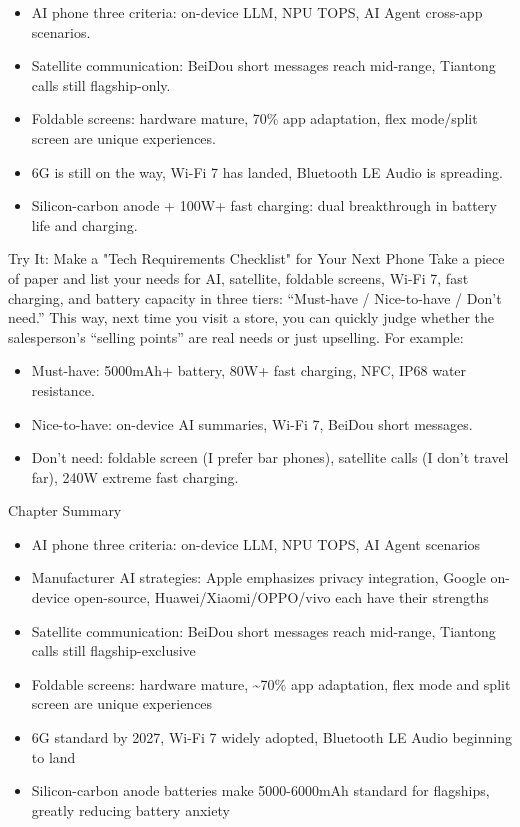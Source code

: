 
\begin{itemize}
  \item AI phone three criteria: on-device LLM, NPU TOPS, AI Agent cross-app scenarios.
  \item Satellite communication: BeiDou short messages reach mid-range, Tiantong calls still flagship-only.
  \item Foldable screens: hardware mature, 70\% app adaptation, flex mode/split screen are unique experiences.
  \item 6G is still on the way, Wi-Fi 7 has landed, Bluetooth LE Audio is spreading.
  \item Silicon-carbon anode + 100W+ fast charging: dual breakthrough in battery life and charging.
\end{itemize}

\begin{tcbpractice}{Try It: Make a "Tech Requirements Checklist" for Your Next Phone}
Take a piece of paper and list your needs for AI, satellite, foldable screens, Wi-Fi 7, fast charging, and battery capacity in three tiers: “Must-have / Nice-to-have / Don't need.” This way, next time you visit a store, you can quickly judge whether the salesperson's “selling points” are real needs or just upselling. For example:

\begin{itemize}
  \item Must-have: 5000mAh+ battery, 80W+ fast charging, NFC, IP68 water resistance.
  \item Nice-to-have: on-device AI summaries, Wi-Fi 7, BeiDou short messages.
  \item Don't need: foldable screen (I prefer bar phones), satellite calls (I don't travel far), 240W extreme fast charging.
\end{itemize}

\end{tcbpractice}

\begin{tcbsummary}{Chapter Summary}
\begin{itemize}
  \item AI phone three criteria: on-device LLM, NPU TOPS, AI Agent scenarios
  \item Manufacturer AI strategies: Apple emphasizes privacy integration, Google on-device open-source, Huawei/Xiaomi/OPPO/vivo each have their strengths
  \item Satellite communication: BeiDou short messages reach mid-range, Tiantong calls still flagship-exclusive
  \item Foldable screens: hardware mature, \textasciitilde{}70\% app adaptation, flex mode and split screen are unique experiences
  \item 6G standard by 2027, Wi-Fi 7 widely adopted, Bluetooth LE Audio beginning to land
  \item Silicon-carbon anode batteries make 5000-6000mAh standard for flagships, greatly reducing battery anxiety
\end{itemize}

\end{tcbsummary}
